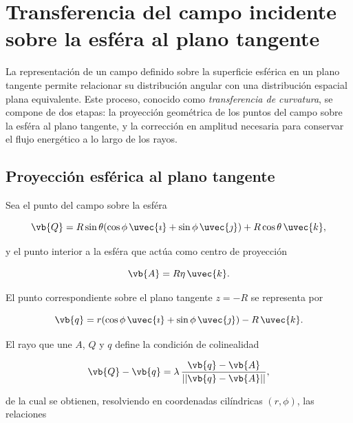 \section{Transferencia del campo incidente sobre la esféra al plano tangente}
\label{sec:transferencia_campo_esfera_plano}

La representación de un campo definido sobre la superficie esférica en un plano tangente permite relacionar su distribución angular con una distribución espacial plana equivalente. Este proceso, conocido como \emph{transferencia de curvatura}, se compone de dos etapas: la proyección geométrica de los puntos del campo sobre la esféra al plano tangente, y la corrección en amplitud necesaria para conservar el flujo energético a lo largo de los rayos.

\subsection{Proyección esférica al plano tangente}
\label{subsec:proyeccion_esfera_plano}

Sea el punto del campo sobre la esféra

\begin{equation}
\vb{Q} = R \sin\theta(\cos\phi\,\uvec{\imath} + \sin\phi\,\uvec{\jmath}) + R\cos\theta\,\uvec{k},
\label{eq:Q_vector}
\end{equation}

y el punto interior a la esféra que actúa como centro de proyección

\begin{equation}
\vb{A} = R\eta\,\uvec{k}.
\label{eq:A_vector}
\end{equation}

El punto correspondiente sobre el plano tangente \(z=-R\) se representa por

\begin{equation}
\vb{q} = r(\cos\phi\,\uvec{\imath} + \sin\phi\,\uvec{\jmath}) - R\,\uvec{k}.
\label{eq:q_vector}
\end{equation}

El rayo que une \(A\), \(Q\) y \(q\) define la condición de colinealidad

\begin{equation}
\vb{Q} - \vb{q} = \lambda \, \frac{\vb{q} - \vb{A}}{||\vb{q} - \vb{A}||},
\label{eq:colinealidad}
\end{equation}

de la cual se obtienen, resolviendo en coordenadas cilíndricas \((r,\phi)\), las relaciones

